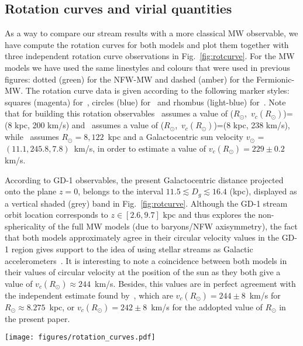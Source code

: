 \documentclass[twocolumn]{aa}
\begin{document}
\subsection{Rotation curves and virial quantities}
As a way to compare our stream results with a more classical MW observable, we have compute the rotation curves for both models and plot them together with three independent rotation curve observations in
Fig.~\ref{fig:rotcurve}.
For the MW models we have used the same linestyles and colours that were used in previous figures:
dotted (green) for the NFW-MW and dashed (amber) for the Fermionic-MW.
The rotation curve data is given according to the following marker styles: squares (magenta)
for~\citet{sofue_rotation_2013}, circles (blue) for~\citet{Eilers_2019} and rhombus (light-blue)
for~\citet{sofue_2020}. Note that for building this rotation observables~\citet{sofue_rotation_2013}
assumes a value of ($R_\odot$,~$v_c(R_\odot)$)=(8 kpc, 200 km/s) and~\citet{sofue_2020} assumes
a value of ($R_\odot$,~$v_c(R_\odot)$)=(8 kpc, 238 km/s), while~\citet{Eilers_2019}
assumes $R_\odot=8,122$~kpc and a Galactocentric sun velocity $v_\odot$ = $(11.1, 245.8, 7.8)$~km/s,
in order to estimate a value of $v_c(R_\odot)=229\pm0.2$ km/s.

According to GD-1 observables, the present Galactocentric distance projected onto the plane $z=0$,
belongs to the interval $11.5 \lesssim D_g \lesssim 16.4$ (kpc), displayed as a vertical shaded (grey) band in
Fig.~\ref{fig:rotcurve}.
Although the GD-1 stream orbit location corresponds to $z\in [2.6, 9.7]$ kpc and thus explores the non-sphericality of the full MW models (due to baryons/NFW axisymmetry), the fact that both models approximately agree in their circular velocity values in the GD-1 region gives support to the idea of using stellar streams as Galactic
accelerometers~\citep{Ibata_2016,2022ApJ...940...22N,2023ApJ...945L..32C}.
It is interesting to note a coincidence between both models in their values of circular velocity
at the position of the sun as they both give a value of $v_c(R_\odot)\approx 244$~km/s.
Besides, this values are in perfect agreement with the independent estimate found
by~\citet{2020arXiv201202169B}, which are $v_c(R_\odot)=244\pm 8$~km/s for $R_\odot \approx 8.275$~kpc, or $v_c(R_\odot)=242\pm 8$~km/s for the addopted value of $R_\odot$ in the present paper.

\begin{figure*}
   \centering
   \texttt{[image: figures/rotation\_curves.pdf]}
   \caption{Rotation curve of MW models and observations: NFW-MW model in dotted (green), Fermionic-MW in dashed (amber),~\citet{sofue_rotation_2013} with squares (magenta),~\citet{Eilers_2019} with circles (blue) for~\citet{Eilers_2019} and~\citet{sofue_2020} with rhombus (light-blue). The region where the GD-1 stream is located at cero redshift is displayed with a vertical grey band.}
   \label{fig:rotcurve}
\end{figure*}
\end{document}
